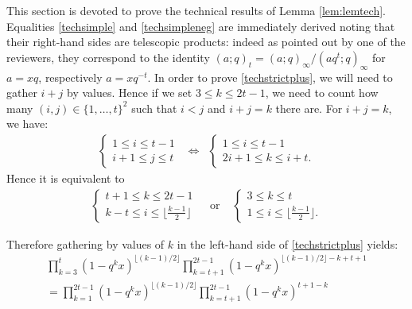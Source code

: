 \documentclass[11pt,letterpaper]{amsart}
\numberwithin{equation}{section}
\numberwithin{df}{section}
\begin{document}
This section is devoted to prove the technical results of Lemma \ref{lem:lemtech}.
Equalities \eqref{techsimple} and \eqref{techsimpleneg} are immediately derived noting that their right-hand sides are telescopic products: indeed as pointed out by one of the reviewers, they correspond to the identity $(a;q)_t=(a;q)_\infty/(aq^{t};q)_\infty$ for $a=xq$, respectively $a=xq^{-t}$.
In order to prove \eqref{techstrictplus}, we will need to gather $i+j$ by values. Hence if we set $3\leq k\leq 2t-1$, we need to count how many $(i,j)\in\lbrace 1,\dots,t\rbrace^2$ such that $i<j$ and $i+j=k$ there are. For $i+j=k$, we have:
\begin{equation*}
\begin{array}{ccc}
\begin{cases}
1\leq i\leq t-1\\
i+1\leq j\leq t
\end{cases}
&\iff &
\begin{cases}
1\leq i\leq t-1\\
2i+1\leq k\leq i+t.
\end{cases}
\end{array}
\end{equation*}
Hence it is equivalent to
\begin{equation*}
\begin{array}{ccc}
\begin{cases}
t+1\leq k\leq 2t-1\\
k-t\leq i\leq \lfloor\frac{k-1}{2}\rfloor
\end{cases}
&\text{ or } &
\begin{cases}
3\leq k\leq t\\
1\leq i\leq \lfloor\frac{k-1}{2}\rfloor.
\end{cases}
\end{array}
\end{equation*}

\noindent Therefore gathering by values of $k$ in the left-hand side of \eqref{techstrictplus} yields:
\begin{multline*}
\prod_{k=3}^{t} \left(1-q^{k}x\right)^{\lfloor(k-1)/2\rfloor}\prod_{k=t+1}^{2t-1} \left(1-q^{k}x\right)^{\lfloor(k-1)/2\rfloor-k+t+1}\\=\prod_{k=1}^{2t-1} \left(1-q^{k}x\right)^{\lfloor(k-1)/2\rfloor}\prod_{k=t+1}^{2t-1} \left(1-q^{k}x\right)^{t+1-k}
\end{multline*}
\end{document}
